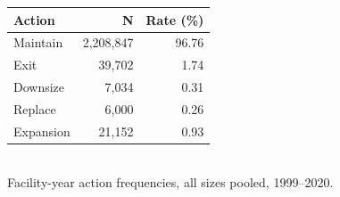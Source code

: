 \begin{table}[ht]
\centering
\small
\renewcommand{\arraystretch}{1.15}
\begin{tabular}{lrr}
\hline
Action & N & Rate (\%) \\
\hline
Maintain & 2,208,847 & 96.76 \\
Exit &    39,702 & 1.74 \\
Downsize &     7,034 & 0.31 \\
Replace &     6,000 & 0.26 \\
Expansion &    21,152 & 0.93 \\
\hline
\end{tabular}
\\[2pt]{\footnotesize Facility-year action frequencies, all sizes pooled, 1999--2020.}
\end{table}
